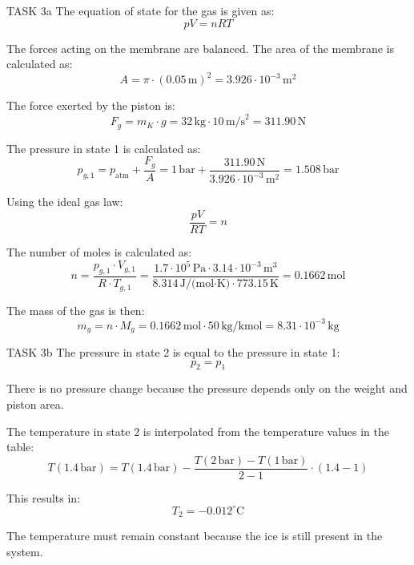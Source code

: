 TASK 3a  
The equation of state for the gas is given as:  
\[
pV = nRT
\]  

The forces acting on the membrane are balanced. The area of the membrane is calculated as:  
\[
A = \pi \cdot (0.05 \, \text{m})^2 = 3.926 \cdot 10^{-3} \, \text{m}^2
\]  

The force exerted by the piston is:  
\[
F_g = m_K \cdot g = 32 \, \text{kg} \cdot 10 \, \text{m/s}^2 = 311.90 \, \text{N}
\]  

The pressure in state 1 is calculated as:  
\[
p_{g,1} = p_{\text{atm}} + \frac{F_g}{A} = 1 \, \text{bar} + \frac{311.90 \, \text{N}}{3.926 \cdot 10^{-3} \, \text{m}^2} = 1.508 \, \text{bar}
\]  

Using the ideal gas law:  
\[
\frac{pV}{RT} = n
\]  

The number of moles is calculated as:  
\[
n = \frac{p_{g,1} \cdot V_{g,1}}{R \cdot T_{g,1}} = \frac{1.7 \cdot 10^5 \, \text{Pa} \cdot 3.14 \cdot 10^{-3} \, \text{m}^3}{8.314 \, \text{J/(mol·K)} \cdot 773.15 \, \text{K}} = 0.1662 \, \text{mol}
\]  

The mass of the gas is then:  
\[
m_g = n \cdot M_g = 0.1662 \, \text{mol} \cdot 50 \, \text{kg/kmol} = 8.31 \cdot 10^{-3} \, \text{kg}
\]  

TASK 3b  
The pressure in state 2 is equal to the pressure in state 1:  
\[
p_2 = p_1
\]  

There is no pressure change because the pressure depends only on the weight and piston area.  

The temperature in state 2 is interpolated from the temperature values in the table:  
\[
T(1.4 \, \text{bar}) = T(1.4 \, \text{bar}) - \frac{T(2 \, \text{bar}) - T(1 \, \text{bar})}{2 - 1} \cdot (1.4 - 1)
\]  

This results in:  
\[
T_2 = -0.012^\circ \text{C}
\]  

The temperature must remain constant because the ice is still present in the system.